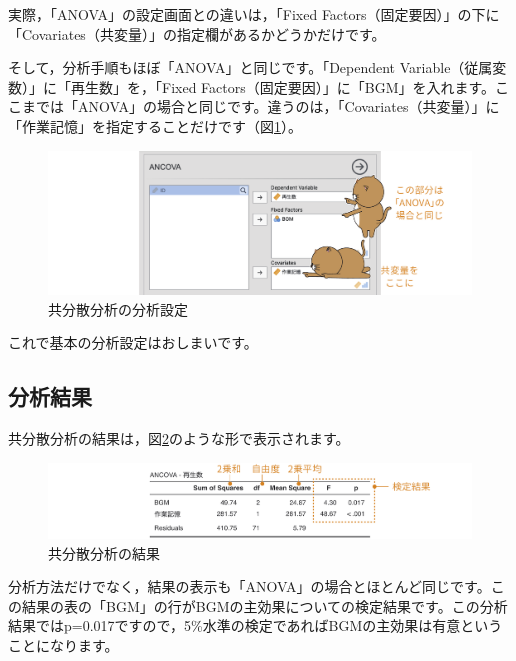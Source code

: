 \documentclass[
  12pt,
  a5jpaper,
  lualatex, ja=standard]{bxjsbook}
\begin{document}
実際，「ANOVA」の設定画面との違いは，「Fixed Factors（固定要因）」の下に「Covariates（共変量）」の指定欄があるかどうかだけです。

そして，分析手順もほぼ「ANOVA」と同じです。「Dependent Variable（従属変数）」に「再生数」を，「Fixed Factors（固定要因）」に「BGM」を入れます。ここまでは「ANOVA」の場合と同じです。違うのは，「Covariates（共変量）」に「作業記憶」を指定することだけです（図\ref{fig:ANOVA-ancova-set-var1}）。

\begin{figure}[!ht]

{\centering \includegraphics[width=1\linewidth]{images/ANOVA/ancova-set-var1} 

}

\caption{共分散分析の分析設定}\label{fig:ANOVA-ancova-set-var1}
\end{figure}

これで基本の分析設定はおしまいです。

\hypertarget{sub:ANOVA-ancova-results}{%
\subsection{分析結果}\label{sub:ANOVA-ancova-results}}

共分散分析の結果は，図\ref{fig:ANOVA-ancova-results}のような形で表示されます。

\begin{figure}[!ht]

{\centering \includegraphics[width=1\linewidth]{images/ANOVA/ancova-results} 

}

\caption{共分散分析の結果}\label{fig:ANOVA-ancova-results}
\end{figure}

分析方法だけでなく，結果の表示も「ANOVA」の場合とほとんど同じです。この結果の表の「BGM」の行がBGMの主効果についての検定結果です。この分析結果ではp=0.017ですので，5\%水準の検定であればBGMの主効果は有意ということになります。
\end{document}
